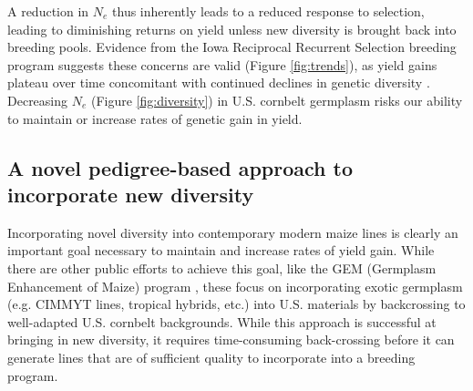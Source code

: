 \documentclass[12pt]{article}
\begin{document}
A reduction in $N_e$ thus inherently leads to a reduced response to  selection, leading to diminishing returns on yield unless new diversity is brought back into breeding pools.
Evidence from the Iowa Reciprocal Recurrent Selection breeding program suggests these concerns are valid (Figure \ref{fig:trends}), as yield gains plateau over time \citep{rouse2003selection} concomitant with continued declines in genetic diversity \citep{Gerke:2013tw}.
Decreasing $N_e$ (Figure \ref{fig:diversity}) in U.S. cornbelt germplasm risks our ability to maintain or increase rates of genetic gain in yield.


\subsection*{A novel pedigree-based approach to incorporate new diversity}

Incorporating novel diversity into contemporary modern maize lines is clearly an important goal necessary to maintain and increase rates of yield gain.
While there are other public efforts to achieve this goal, like the GEM  (Germplasm Enhancement of Maize) program \citep{pollak2003history}, these  focus on incorporating exotic germplasm (e.g. CIMMYT lines, tropical hybrids, etc.) into U.S. materials by backcrossing to well-adapted U.S. cornbelt backgrounds.
While this approach is successful at bringing in new diversity, it requires time-consuming back-crossing before it can generate lines that are of sufficient quality to incorporate into a breeding program.

\end{document}

